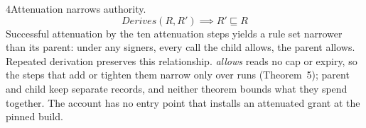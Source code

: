 \begin{perchstatement}{4}{Attenuation narrows authority.}\label{stmt:attenuation-narrows-authority}
\[\mathit{Derives}(R, R') \implies R' \sqsubseteq R\]
Successful attenuation by the ten attenuation steps yields a rule set narrower than its parent: under any signers, every call the child allows, the parent allows. Repeated derivation preserves this relationship. \emph{allows} reads no cap or expiry, so the steps that add or tighten them narrow only over runs (Theorem~5); parent and child keep separate records, and neither theorem bounds what they spend together. The account has no entry point that installs an attenuated grant at the pinned build.
\end{perchstatement}
